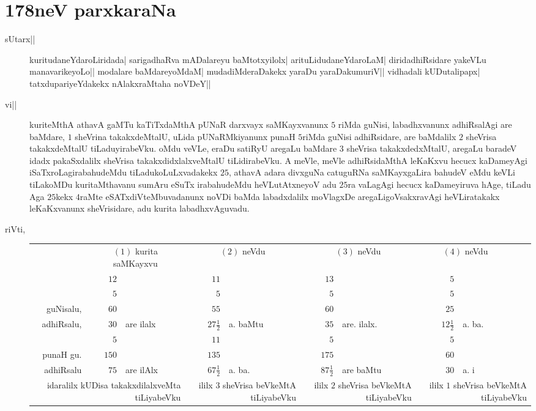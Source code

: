 \chapter{178neV parxkaraNa}


\begin{description}
\item[sUtarx||] kuritudaneYdaroLiridada| sarigadhaRva mADalareyu
  baMtotxyilolx| arituLidudaneYdaroLaM| diridadhiRsidare yakeVLu
  manavarikeyoLo|| modalare baMdareyoMdaM| mudadiMderaDakekx yaraDu
  yaraDakumuriV|| vidhadali kUDutalipapx| tatxdupariyeYdakekx
  nAlakxraMtaha noVDeY||

\item[vi||] kuriteMthA athavA gaMTu kaTiTxdaMthA pUNaR darxvayx
  saMKayxvanunx $5$ riMda guNisi, labadhxvanunx adhiRsalAgi are
  baMdare, $1$ sheVrina takakxdeMtalU, uLida pUNaRMkiyanunx punaH
  $5$riMda guNisi adhiRsidare, are baMdalilx $2$ sheVrisa
  takakxdeMtalU tiLaduyirabeVku. oMdu veVLe, eraDu satiRyU aregaLu
  baMdare $3$ sheVrisa takakx\-dedxMtalU, aregaLu baradeV idadx
  pakaSxdalilx sheVrisa takakxdidxlalxveMtalU tiLidirabeVku. A meVle,
  meVle adhiRsidaMthA leKaKxvu hecucx kaDameyAgi
  iSaTxroLagirabahudeMdu tiLadukoLuLxvadakekx $25$, athavA adara
  divxguNa catuguRNa saMKayxgaLira bahudeV eMdu keVLi tiLakoMDu
  kuritaMthavanu sumAru eSuTx irabahudeMdu heVLutAtxneyoV adu $25$ra
  vaLagAgi hecucx kaDameyiruva hAge, tiLadu Aga $25$kekx $4$raMte
  eSATxdiVteMbuvadanunx noVDi baMda labadxdalilx moVlagxDe
  aregaLigoVsakxravAgi heVLiratakakx leKaKxvanunx sheVrisidare, adu
  kurita labadhxvAguvadu.

\item[riVti,] 


\renewcommand{\arraystretch}{1.2}
\setlength\tabcolsep{4pt}
  \begin{tabular}[t]{rrlrlrlrll}
    & \multicolumn{2}{c}{$(1)$ kurita saMKayxvu} &
    \multicolumn{2}{c}{$(2)$ neVdu} &
    \multicolumn{2}{c}{$(3)$ neVdu} &
    \multicolumn{2}{c}{$(4)$ neVdu} \\[6pt]
    & $12$ && $11$ && $13$ && $5$&\\
    & $5$ && $5$ && $5$ && $5$&\\    
    \hline
    guNisalu, & $60$ && $55$ && $60$ && $25$\\
    \hline
    adhiRsalu, & $30$ &are ilalx& $27\frac{1}{2}$ &a. baMtu& $35$
    &are. ilalx.& $12 \frac{1}{2}$& a. ba.\\
    &     $5$ && $11$ && $5$ && $5$ &\\
    \hline
    punaH gu. & $150$ && $135$ && $175$ && $60$\\
    \hline
    adhiRsalu & $75$ &are ilAlx & $67\frac{1}{2}$ & a. ba. & $87
    \frac{1}{2}$ & are baMtu & $30$ &a. i\\
    \multicolumn{3}{p{3cm}}{idaralilx kUDisa takakxdilalxveMta tiLiyabeVku}
    & \multicolumn{2}{p{2cm}}{ililx $3$ sheVrisa beVkeMtA tiLiyabeVku} &
    \multicolumn{2}{p{2cm}}{ililx $2$ sheVrisa beVkeMtA tiLiyabeVku} &
    \multicolumn{3}{p{2cm}}{ililx $1$ sheVrisa beVkeMtA tiLiyabeVku}
  \end{tabular}


\end{description}
